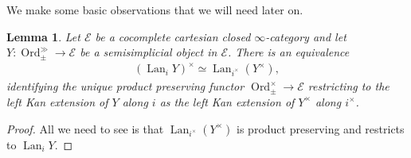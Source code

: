\documentclass[12pt, reqno]{amsart}
\theoremstyle{plain}
\newtheorem{lemma}[theorem]{Lemma}
\theoremstyle{definition}
\begin{document}
We make some basic observations that we will need later on.

\begin{lemma}\label{LKE and free product completion}
Let $\mathcal{E}$ be a cocomplete cartesian closed $\infty$-category and let $Y\colon \operatorname{Ord}_\pm^\gg\rightarrow \mathcal{E}$ be a semisimplicial object in $\mathcal{E}$. There is an equivalence
\begin{align*}
(\operatorname{Lan}_iY)^\times\simeq \operatorname{Lan}_{i^\times} (Y^\times),
\end{align*}
identifying the unique product preserving functor $\operatorname{Ord}_\pm^\times\rightarrow \mathcal{E}$ restricting to the left Kan extension of $Y$ along $i$ as the left Kan extension of $Y^\times$ along $i^\times$.
\end{lemma}
\begin{proof}
All we need to see is that $\operatorname{Lan}_{i^\times}(Y^\times)$ is product preserving and restricts to $\operatorname{Lan}_i Y$.


\end{proof}
\end{document}
